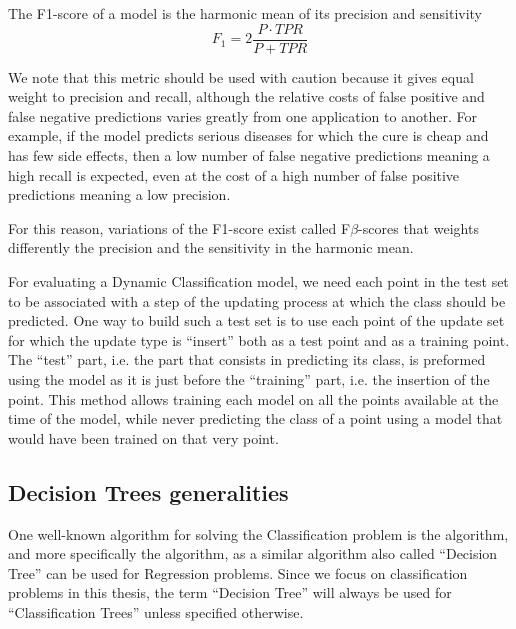 \begin{definition}[F1-score]
    The F1-score of a model is the harmonic mean of its precision and sensitivity
    \begin{equation}
        F_1 = 2\frac{P \cdot TPR}{P + TPR}
    \end{equation}
\end{definition}

We note that this metric should be used with caution because it gives equal weight to precision and recall, although the relative costs of false positive and false negative predictions varies greatly from one application to another. For example, if the model predicts serious diseases for which the cure is cheap and has few side effects, then a low number of false negative predictions meaning a high recall is expected, even at the cost of a high number of false positive predictions meaning a low precision.

For this reason, variations of the F1-score exist called F$\beta$-scores that weights differently the precision and the sensitivity in the harmonic mean.

For evaluating a Dynamic Classification model, we need each point in the test set to be associated with a step of the updating process at which the class should be predicted. One way to build such a test set is to use each point of the update set for which the update type is “insert” both as a test point and as a training point. The “test” part, i.e. the part that consists in predicting its class, is preformed using the model as it is just before the “training” part, i.e. the insertion of the point. This method allows training each model on all the points available at the time of the model, while never predicting the class of a point using a model that would have been trained on that very point.

\subsection{Decision Trees generalities}\label{sec:decision_trees_general}
One well-known algorithm for solving the Classification problem is the  algorithm, and more specifically the  algorithm, as a similar algorithm also called “Decision Tree” can be used for Regression problems. Since we focus on classification problems in this thesis, the term “Decision Tree” will always be used for “Classification Trees” unless specified otherwise.

